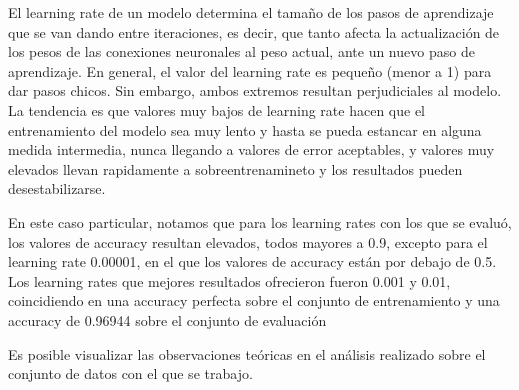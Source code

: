 \documentclass{article}
\begin{document}
El learning rate de un modelo determina el tamaño de los pasos de aprendizaje que se van dando entre iteraciones, es decir, que tanto afecta la actualización de los pesos de las conexiones neuronales al peso actual, ante un nuevo paso de aprendizaje.
En general, el valor del learning rate es pequeño (menor a 1) para dar pasos chicos. Sin embargo, ambos extremos resultan perjudiciales al modelo. La tendencia es que valores muy bajos de learning rate hacen que el entrenamiento del modelo sea muy lento y hasta se pueda estancar en alguna medida intermedia, nunca llegando a valores de error aceptables, y valores muy elevados llevan rapidamente a sobreentrenamineto y los resultados pueden desestabilizarse.

En este caso particular, notamos que para los learning rates con los que se evaluó, los valores de accuracy resultan elevados, todos mayores a 0.9, excepto para el learning rate 0.00001, en el que los valores de accuracy están por debajo de 0.5. Los learning rates que mejores resultados ofrecieron fueron 0.001 y 0.01, coincidiendo en una accuracy perfecta sobre el conjunto de entrenamiento y una accuracy de 0.96944 sobre el conjunto de evaluación

Es posible visualizar las observaciones teóricas en el análisis realizado sobre el conjunto de datos con el que se trabajo.
\end{document}
